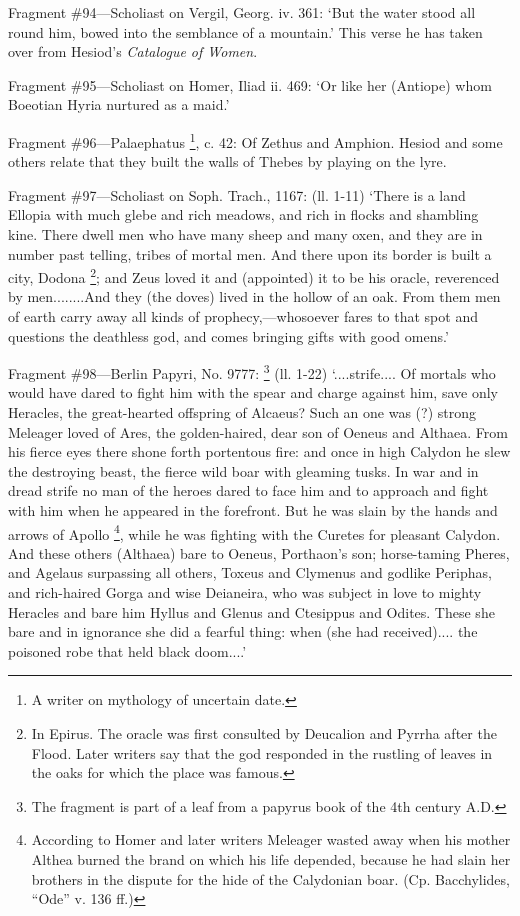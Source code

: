 Fragment \#94—Scholiast on Vergil, Georg. iv. 361: ‘But the water
stood all round him, bowed into the semblance of a mountain.’ This verse
he has taken over from Hesiod’s \emph{Catalogue of Women}.

Fragment \#95—Scholiast on Homer, Iliad ii. 469: ‘Or like her
(Antiope) whom Boeotian Hyria nurtured as a maid.’

Fragment \#96—Palaephatus \footnote{A writer on mythology of
uncertain date.}, c. 42: Of Zethus and Amphion.
Hesiod and some others relate that they built the walls of Thebes by playing on
the lyre.

Fragment \#97—Scholiast on Soph. Trach., 1167: (ll. 1-11) ‘There is
a land Ellopia with much glebe and rich meadows, and rich in flocks and
shambling kine. There dwell men who have many sheep and many oxen, and they are
in number past telling, tribes of mortal men. And there upon its border is
built a city, Dodona \footnote{In Epirus. The oracle was
first consulted by Deucalion and Pyrrha after the Flood. Later writers say that
the god responded in the rustling of leaves in the oaks for which the place was
famous.}; and Zeus loved it and
(appointed) it to be his oracle, reverenced by men........And they (the doves)
lived in the hollow of an oak. From them men of earth carry away all kinds of
prophecy,—whosoever fares to that spot and questions the deathless god,
and comes bringing gifts with good omens.’

Fragment \#98—Berlin Papyri, No. 9777: \footnote{The fragment is part of a
leaf from a papyrus book of the 4th century A.D.} (ll.
1-22) ‘....strife.... Of mortals who would have dared to fight him with
the spear and charge against him, save only Heracles, the great-hearted
offspring of Alcaeus? Such an one was (?) strong Meleager loved of Ares, the
golden-haired, dear son of Oeneus and Althaea. From his fierce eyes there shone
forth portentous fire: and once in high Calydon he slew the destroying beast,
the fierce wild boar with gleaming tusks. In war and in dread strife no man of
the heroes dared to face him and to approach and fight with him when he
appeared in the forefront. But he was slain by the hands and arrows of Apollo
\footnote{According to Homer and
later writers Meleager wasted away when his mother Althea burned the brand on
which his life depended, because he had slain her brothers in the dispute for
the hide of the Calydonian boar. (Cp. Bacchylides, “Ode” v. 136
ff.)}, while he was fighting with the
Curetes for pleasant Calydon. And these others (Althaea) bare to Oeneus,
Porthaon’s son; horse-taming Pheres, and Agelaus surpassing all others,
Toxeus and Clymenus and godlike Periphas, and rich-haired Gorga and wise
Deianeira, who was subject in love to mighty Heracles and bare him Hyllus and
Glenus and Ctesippus and Odites. These she bare and in ignorance she did a
fearful thing: when (she had received).... the poisoned robe that held black
doom....’

